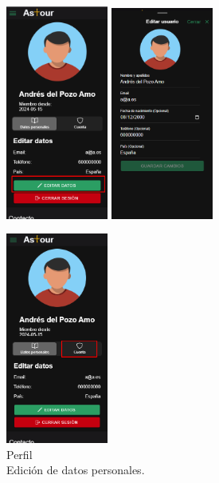 \begin{figure}[H]
	\centering
	\begin{minipage}{0.45\textwidth}
		\centering
		\includegraphics[width=0.3\textwidth]{7-Construccion/Manuales/mobile/editar datos.png}
		\includegraphics[width=0.3\textwidth]{7-Construccion/Manuales/mobile/formulario perfil.png}
		\caption{Perfil \\ Edición de datos personales.}
		\label{fig:areaPersonal-editar}
	\end{minipage}
	\hfill
	\begin{minipage}{0.45\textwidth}
		\centering
		\includegraphics[width=0.3\textwidth]{7-Construccion/Manuales/mobile/apartado cuenta seleccionado.png}

\end{minipage}
\end{figure}
